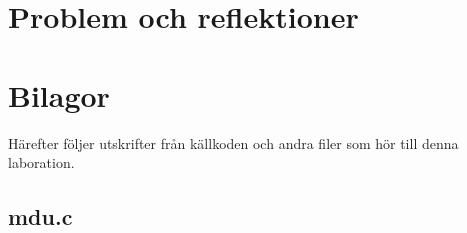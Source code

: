\documentclass[a4paper, 12pt]{article}
\begin{document}
\section{Problem och reflektioner}\label{sec:problemochreflektioner}

\newpage
\appendix
{}
\section{Bilagor}\label{Bilagor}
Härefter följer utskrifter från källkoden och andra filer som hör till
denna laboration.

\newpage
\subsection{mdu.c}\label{mdu.c}
\begin{scriptsize}
  
\end{scriptsize}
\end{document}
